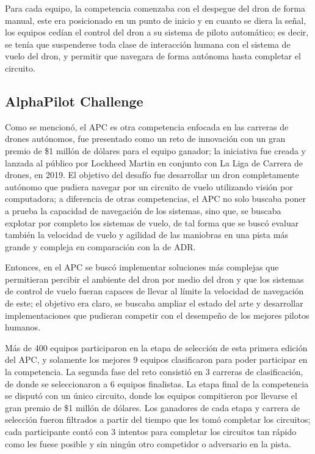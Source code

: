 Para cada equipo, la competencia comenzaba con el despegue del dron de forma manual, este era posicionado en un punto de inicio y en cuanto se diera la señal, los equipos cedían el control del dron a su sistema de piloto automático; es decir, se tenía que suspenderse toda clase de interacción humana con el sistema de vuelo del dron, y permitir que navegara de forma autónoma hasta completar el circuito. 

\subsection{AlphaPilot Challenge}
Como se mencionó, el APC es otra competencia enfocada en las carreras de drones autónomos, fue presentado como un reto de innovación con un gran premio de \$1 millón de dólares para el equipo ganador; la iniciativa fue creada y lanzada al público por Lockheed Martin en conjunto con La Liga de Carrera de drones, en 2019. El objetivo del desafío fue desarrollar un dron completamente autónomo que pudiera navegar por un circuito de vuelo utilizando visión por computadora; a diferencia de otras competencias, el APC no solo buscaba poner a prueba la capacidad de navegación de los sistemas, sino que, se buscaba explotar por completo los sistemas de vuelo, de tal forma que se buscó evaluar también la velocidad de vuelo y agilidad de las maniobras en una pista  más grande y compleja en comparación con la de ADR. 

Entonces, en el APC se buscó implementar soluciones más complejas que permitieran percibir el ambiente del dron por medio del dron y que los sistemas de control de vuelo fueran capaces de llevar al límite la velocidad de navegación de este; el objetivo era claro, se buscaba ampliar el estado del arte y desarrollar implementaciones que pudieran competir con el desempeño de los mejores pilotos humanos. 

Más de 400 equipos participaron en la etapa de selección de esta primera edición del APC, y solamente los mejores 9 equipos clasificaron para poder participar en la competencia. La segunda fase del reto consistió en 3 carreras de clasificación, de donde se seleccionaron a 6 equipos finalistas. La etapa final de la competencia se disputó con un único circuito, donde los equipos compitieron por llevarse el gran premio de \$1 millón de dólares. Los ganadores de cada etapa y carrera de selección fueron filtrados a partir del tiempo que les tomó completar los circuitos; cada participante contó con 3 intentos para completar los circuitos tan rápido como les fuese posible y sin ningún otro competidor o adversario en la pista.

